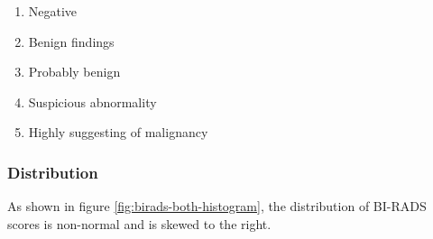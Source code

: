 \documentclass[12pt]{article}
\begin{document}
        \begin{enumerate}[label=\arabic*)]
          \item Negative
          \item Benign findings
          \item Probably benign
          \item Suspicious abnormality
          \item Highly suggesting of malignancy
        \end{enumerate}

      \subsubsection{Distribution}
        As shown in figure \ref{fig:birads-both-histogram}, the distribution of BI-RADS scores is non-normal and is skewed to the right.
\end{document}
